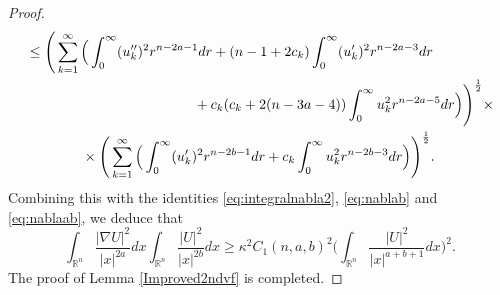\documentclass[a4paper,12pt]{article}
\theoremstyle{plain}
\theoremstyle{definition}
\theoremstyle{remark}
\def\R{\mathbb R}%
\def\irn{\int_{\R^n}}
\numberwithin{equation}{section}
\begin{document}
\begin{proof}
\begin{align*}
&\leq \Bigg(\sum_{k=1}^\infty \Big(\int_0^\infty (u_k'')^2 r^{n-2a -1} dr + (n-1 +2c_k) \int_0^\infty (u_k')^2 r^{n-2a -3} dr \notag\\
&\qquad\qquad\qquad \qquad\qquad\qquad+ c_k(c_k + 2(n-3a -4))\int_0^\infty u_k^2 r^{n -2a -5} dr\Big)\Bigg)^{\frac12} \times \notag\\
&\qquad\qquad \times \Bigg(\sum_{k=1}^\infty\Big(\int_0^\infty (u_k')^2 r^{n-2b -1} dr + c_k \int_0^\infty u_k^2 r^{n -2b -3} dr\Big)\Bigg)^{\frac12}.
\end{align*}
Combining this with the  identities \eqref{eq:integralnabla2}, \eqref{eq:nablab} and \eqref{eq:nablaab}, we deduce that 
\begin{equation*}%
\irn \frac{|\nabla U|^2}{|x|^{2a}} dx \irn \frac{|U|^2}{|x|^{2b}} dx \geq \kappa^2 C_1(n,a,b)^2 \Big(\irn \frac{|U|^2}{|x|^{a+b+1}} dx\Big)^2.
\end{equation*}
The proof of Lemma \ref{Improved2ndvf} is completed.
\end{proof}
\end{document}
